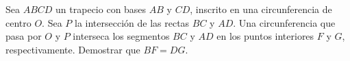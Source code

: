 Sea $ABCD$ un trapecio con bases $AB$ y $CD$, inscrito en una circunferencia de centro $O$. Sea $P$ la intersección de las rectas $BC$ y $AD$. Una circunferencia que pasa por $O$ y $P$ interseca los segmentos $BC$ y $AD$ en los puntos interiores $F$ y $G$, respectivamente. Demostrar que $BF=DG$.
